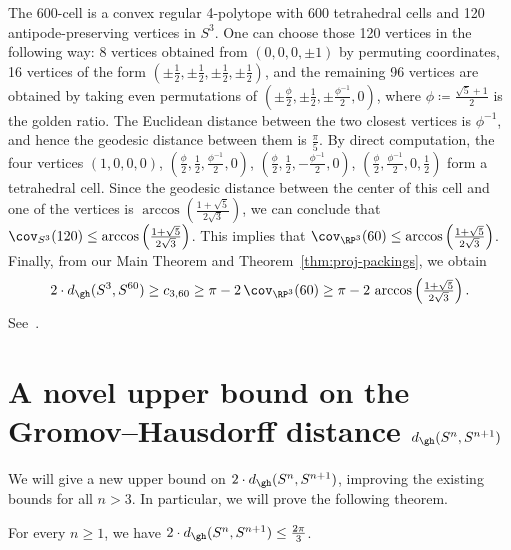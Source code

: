 \documentclass[11pt, reqno, english]{amsart}
\begin{document}
\begin{remark}
\label{rem:600-cell}
The 600-cell is a convex regular 4-polytope with 600 tetrahedral cells and 120 antipode-preserving vertices in $S^3$.
One can choose those 120 vertices in the following way: 8 vertices obtained from $(0,0,0,\pm 1)$ by permuting coordinates, 16 vertices of the form $\left(\pm\tfrac{1}{2},\pm\tfrac{1}{2},\pm\tfrac{1}{2},\pm\tfrac{1}{2}\right)$, and the remaining 96 vertices are obtained by taking even permutations of $\left(\pm\tfrac{\phi}{2},\pm\tfrac{1}{2},\pm\tfrac{\phi^{-1}}{2},0\right)$, where $\phi\coloneqq\tfrac{\sqrt{5}+1}{2}$ is the golden ratio.
The Euclidean distance between the two closest vertices is $\phi^{-1}$, and hence the geodesic distance between them is $\tfrac{\pi}{5}$.
By direct computation, the four vertices $(1,0,0,0)$, $\left(\tfrac{\phi}{2},\tfrac{1}{2},\tfrac{\phi^{-1}}{2},0\right)$, $\left(\tfrac{\phi}{2},\tfrac{1}{2},-\tfrac{\phi^{-1}}{2},0\right)$, $\left(\tfrac{\phi}{2},\tfrac{\phi^{-1}}{2},0,\tfrac{1}{2}\right)$ form a tetrahedral cell.
Since the geodesic distance between the center of this cell and one of the vertices is $\arccos\left(\tfrac{1+\sqrt{5}}{2\sqrt{3}}\right)$, we can conclude that $\cov_{S^3}(120)\leq \arccos\left(\tfrac{1+\sqrt{5}}{2\sqrt{3}}\right)$.
This implies that $\cov_{\RP^3}(60)\leq \arccos\left(\tfrac{1+\sqrt{5}}{2\sqrt{3}}\right)$.
Finally, from our Main Theorem and Theorem~\ref{thm:proj-packings}, we obtain
\[2\cdot d_{\gh}(S^3, S^{60})\geq c_{3,60}\geq\pi-2\,\cov_{\RP^3}(60)\geq\pi-2\,\arccos\left(\tfrac{1+\sqrt{5}}{2\sqrt{3}}\right).\]
See~\cite[Remark~4.2]{ABF2}.
\end{remark}



\section{A novel upper bound on the Gromov--Hausdorff distance \texorpdfstring{$d_{\gh}(S^n, S^{n+1})$}{d GH S n S n+1}}
\label{sec:super-diag-upper-bound}

We will give a new upper bound on $2\cdot d_\gh(S^n, S^{n+1})$, improving the existing bounds for all $n > 3$.
In particular, we will prove the following theorem.

\begin{theorem-super-diag}
For every $n\ge 1$, we have $2\cdot d_\gh(S^n, S^{n+1}) \le \frac{2\pi}{3}$.
\end{theorem-super-diag}
\end{document}
